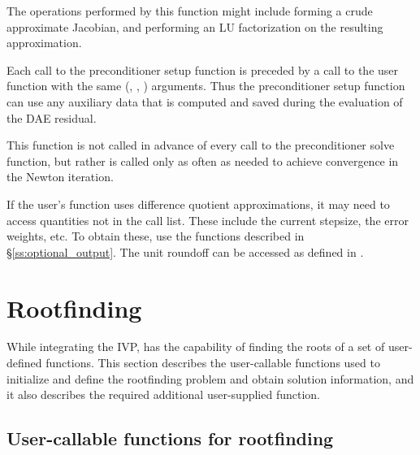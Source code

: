 {
  The operations performed by this function might include forming a crude
  approximate Jacobian, and performing an LU factorization on the resulting
  approximation.

  Each call to the preconditioner setup function is preceded by a call to     
  the  user function with the same (, , ) arguments.  
  Thus the preconditioner setup function can use any auxiliary data that is 
  computed and saved during the evaluation of the DAE residual.
  
  This function is not called in advance of every call to the preconditioner solve
  function, but rather is called only as often as needed to achieve convergence in the
  Newton iteration.

  If the user's  function uses difference quotient
  approximations, it may need to access quantities not in the call
  list. These include the current stepsize, the error weights, etc.
  To obtain these, use the  functions described in
  \S\ref{ss:optional_output}. The unit roundoff can be accessed
  as  defined in .

}

\section{Rootfinding}\label{s:using_rootfinding}

While integrating the IVP, {\ida} has the capability of finding the
roots of a set of user-defined functions. This section describes the
user-callable functions used to initialize and define the rootfinding
problem and obtain solution information, and it also describes the
required additional user-supplied function.

\subsection{User-callable functions for rootfinding}\label{ss:root_uc}

